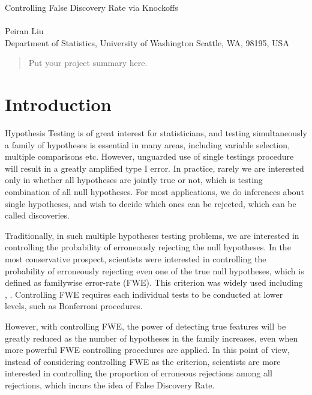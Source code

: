 \documentclass{uwstat572}
\begin{document}

\begin{center}
  {\LARGE Controlling False Discovery Rate via Knockoffs}\\\ \\
  {Peiran Liu \\ 
    Department of Statistics, University of Washington Seattle, WA, 98195, USA
  }
\end{center}



\begin{abstract}
  Put your project summary here.
\end{abstract}

\section{Introduction}
Hypothesis Testing is of great interest for statisticians, and testing simultaneously a family of hypotheses is essential in many areas, including variable selection, multiple comparisons etc. However, unguarded use of single testings procedure will result in a greatly amplified type I error. In practice, rarely we are interested only in whether all hypotheses are jointly true or not, which is testing combination of all null hypotheses. For most applications, we do inferences about single hypotheses, and wish to decide which ones can be rejected, which can be called discoveries. 

Traditionally, in such multiple hypotheses testing problems, we are interested in controlling the probability of erroneously rejecting the null hypotheses. In the most conservative prospect, scientists were interested in controlling the probability of erroneously rejecting even one of the true null hypotheses, which is defined as familywise error-rate (FWE). This criterion was widely used including \cite{hochberg2009multiple}, \cite{westfall1993resampling}. Controlling FWE requires each individual tests to be conducted at lower levels, such as Bonferroni procedures. 

However, with controlling FWE, the power of detecting true features will be greatly reduced as the number of hypotheses in the family increases, even when more powerful FWE controlling procedures are applied. In this point of view, instead of considering controlling FWE as the criterion, scientists are more interested in controlling the proportion of erroneous rejections among all rejections, which incurs the idea of False Discovery Rate.
\end{document}
